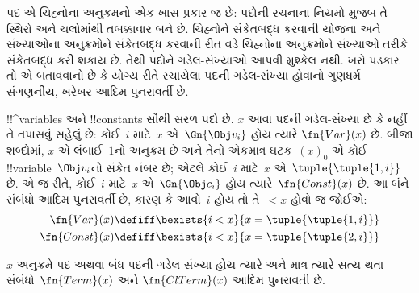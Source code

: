 \documentclass[../../../include/open-logic-section]{subfiles}
\begin{document}

\begin{explain}
પદ એ ચિહ્નોના અનુક્રમનો એક ખાસ પ્રકાર
જ છે: પદોની રચનાના નિયમો મુજબ તે
સ્થિરો અને ચલોમાંથી તબક્કાવાર
બને છે. ચિહ્નોને સંકેતબદ્ધ કરવાની યોજના
અને સંખ્યાઓના અનુક્રમોને સંકેતબદ્ધ કરવાની
રીત વડે ચિહ્નોના અનુક્રમોને સંખ્યાઓ તરીકે
સંકેતબદ્ધ કરી શકાય છે. તેથી પદોને
ગડેલ-સંખ્યાઓ આપવી મુશ્કેલ નથી.
ખરો પડકાર તો એ બતાવવાનો છે કે
યોગ્ય રીતે રચાયેલા પદની ગડેલ-સંખ્યા
હોવાનો ગુણધર્મ સંગણનીય, ખરેખર આદિમ
પુનરાવર્તી છે.
\end{explain}

!!^{variable}s અને !!{constant}s સૌથી
સરળ પદો છે. $x$ આવા પદની ગડેલ-સંખ્યા
છે કે નહીં તે તપાસવું સહેલું છે:
કોઈ~$i$ માટે~$x$ એ~$\Gn{\Obj v_i}$
હોય ત્યારે $\fn{Var}(x)$ છે. બીજા
શબ્દોમાં, $x$ એ લંબાઈ~$1$નો અનુક્રમ છે
અને તેનો એકમાત્ર ઘટક~$(x)_0$ એ
કોઈ !!{variable}~$\Obj v_i$નો સંકેત
નંબર છે; એટલે કોઈ~$i$ માટે~$x$
એ~$\tuple{\tuple{1, i}}$ છે. એ જ રીતે,
કોઈ~$i$ માટે~$x$ એ~$\Gn{\Obj c_i}$
હોય ત્યારે~$\fn{Const}(x)$ છે. આ
બંને સંબંધો આદિમ પુનરાવર્તી છે, કારણ કે
આવો~$i$ હોય તો તે~$< x$ હોવો જ
જોઈએ:
\begin{align*}
  \fn{Var}(x) & \defiff \bexists{i<x}{x = \tuple{\tuple{1, i}}}\\
  \fn{Const}(x) & \defiff \bexists{i<x}{x = \tuple{\tuple{2, i}}}
\end{align*}

\begin{prop}
$x$ અનુક્રમે પદ અથવા બંધ પદની
ગડેલ-સંખ્યા હોય ત્યારે અને માત્ર ત્યારે
સત્ય થતા સંબંધો~$\fn{Term}(x)$ અને
$\fn{ClTerm}(x)$ આદિમ પુનરાવર્તી છે.
\end{prop}
\end{document}
